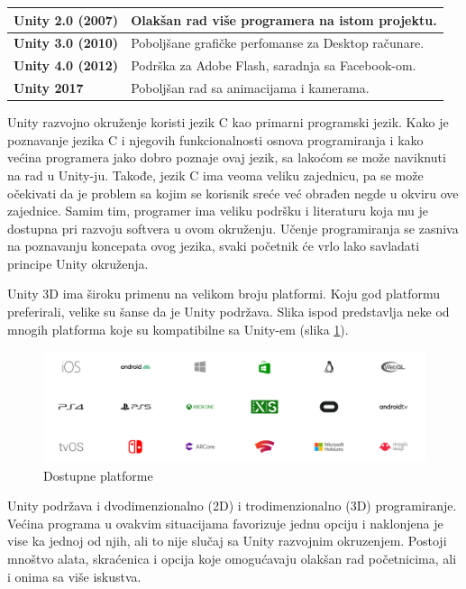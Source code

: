 \documentclass[12pt]{article}
\begin{document}
\begin{table}[ht!]
\label{tab:unity_verzije}
\begin{tabular}{|l|l|}
\hline
\multicolumn{1}{|c|}{\textbf{Unity 2.0 (2007)}} & Olakšan rad više programera na istom projektu.\\ \hline
\textbf{Unity 3.0 (2010)}                       & Poboljšane grafičke perfomanse za Desktop računare.                               \\ \hline
\textbf{Unity 4.0 (2012)}                       & Podrška za Adobe Flash, saradnja sa Facebook-om. \\ \hline
\textbf{Unity 2017}                             & Poboljšan rad sa animacijama i kamerama. \\ \hline
\end{tabular}
\end{table}
Unity razvojno okruženje koristi jezik C kao primarni programski jezik.
Kako je poznavanje jezika C i njegovih funkcionalnosti osnova programiranja i kako većina programera jako dobro poznaje ovaj jezik, sa lakoćom se može naviknuti na rad u Unity-ju. Takođe, jezik C ima veoma veliku zajednicu, pa se može očekivati da je problem sa kojim se korisnik sreće već obrađen negde u okviru ove zajednice. Samim tim, programer ima veliku podršku i literaturu koja mu je dostupna pri razvoju softvera u ovom okruženju. Učenje programiranja se zasniva na poznavanju koncepata ovog jezika, svaki početnik će vrlo lako savladati principe Unity okruženja. 

Unity 3D ima široku primenu na velikom broju platformi.
Koju god platformu preferirali, velike su šanse da je Unity podržava.
Slika ispod predstavlja neke od mnogih platforma koje su kompatibilne sa Unity-em (slika \ref{fig:dostupne_platforme}). 

\begin{figure}[ht!]
    \centering
    \includegraphics[scale=0.29]{platforme.png}
    \caption{Dostupne platforme}
    \label{fig:dostupne_platforme}
\end{figure}


Unity podržava i dvodimenzionalno (2D) i trodimenzionalno (3D) programiranje. Većina programa u ovakvim situacijama favorizuje jednu opciju i naklonjena je vise ka jednoj od njih, ali to nije slučaj sa Unity razvojnim okruzenjem. Postoji mnoštvo alata, skraćenica i opcija koje omogućavaju olakšan rad početnicima, ali i onima sa više iskustva. 
\end{document}

